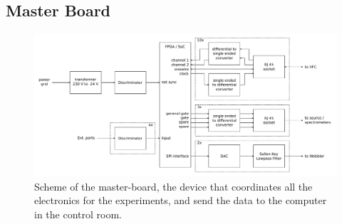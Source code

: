 \subsection{Master Board}

\begin{figure}[hbtp]

\centering
\includegraphics[width = \textwidth]{ExperimentalSetup/masterboard.pdf}
\caption{Scheme of the master-board, the device that coordinates all the electronics for the experiments, and send the data to the computer in the control room.}
\end{figure}

